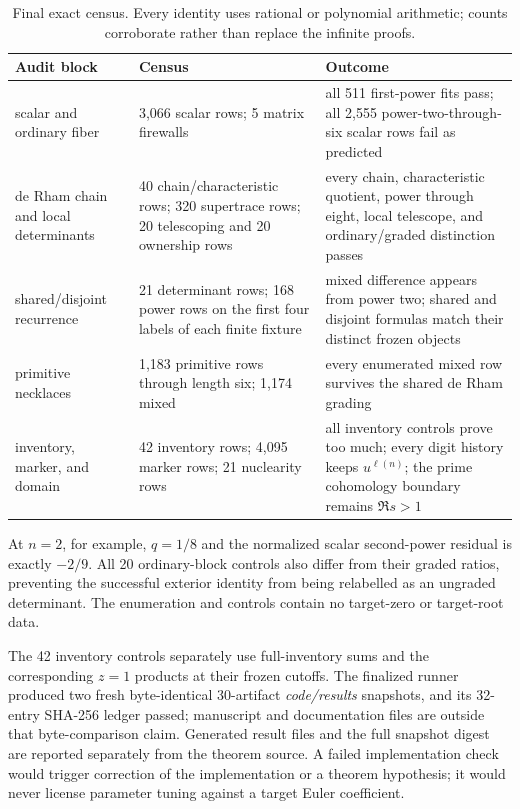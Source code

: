 \begin{table}[H]
\centering
\caption{Final exact census.  Every identity uses rational or polynomial
arithmetic; counts corroborate rather than replace the infinite proofs.}
\label{tab:exact-census}
\small
\begin{tabularx}{\textwidth}{L{3.3cm}L{3.5cm}Y}
\toprule
Audit block & Census & Outcome \\
\midrule
scalar and ordinary fiber
& 3,066 scalar rows; 5 matrix firewalls
& all 511 first-power fits pass; all 2,555 power-two-through-six scalar
rows fail as predicted \\
de Rham chain and local determinants
& 40 chain/characteristic rows; 320 supertrace rows; 20 telescoping and 20 ownership rows
& every chain, characteristic quotient, power through eight, local telescope,
and ordinary/graded distinction passes \\
shared/disjoint recurrence
& 21 determinant rows; 168 power rows on the first four labels of each finite fixture
& mixed difference appears from power two; shared and disjoint formulas match
their distinct frozen objects \\
primitive necklaces
& 1,183 primitive rows through length six; 1,174 mixed
& every enumerated mixed row survives the shared de Rham grading \\
inventory, marker, and domain
& 42 inventory rows; 4,095 marker rows; 21 nuclearity rows
& all inventory controls prove too much; every digit history keeps
\(u^{\ell(n)}\); the prime cohomology boundary remains \(\Re s>1\) \\
\bottomrule
\end{tabularx}
\end{table}

At \(n=2\), for example, \(q=1/8\) and the normalized scalar
second-power residual is exactly \(-2/9\).  All 20 ordinary-block controls
also differ from their graded ratios, preventing the successful exterior
identity from being relabelled as an ungraded determinant.  The enumeration
and controls contain no target-zero or target-root data.

The 42 inventory controls separately use full-inventory sums and the
corresponding \(z=1\) products at their frozen cutoffs.  The finalized runner
produced two fresh byte-identical 30-artifact \emph{code/results} snapshots,
and its 32-entry SHA-256 ledger passed; manuscript and documentation files are
outside that byte-comparison claim.  Generated result files and the full
snapshot digest are reported separately from the theorem source.  A failed
implementation check would trigger correction of the implementation or a
theorem hypothesis; it would never license parameter tuning against a target
Euler coefficient.
